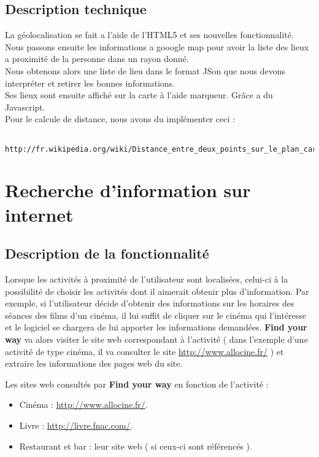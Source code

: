 \documentclass[10pt,a4paper]{report}
\begin{document}
\subsection{Description technique}
\begin{flushleft}
La géolocalisation se fait a l'aide de l'HTML5 et ses nouvelles fonctionnalité. Nous passons ensuite les informations a gooogle map pour avoir la liste des lieux a proximité de la personne dans un rayon donné. \\
Nous obtenons alors une liste de lieu dans le format JSon que nous devons interpréter et retirer les bonnes informations.\\
Ses lieux sont ensuite affiché sur la carte à l'aide marqueur. Grâce a du Javascript. \\

Pour le calcule de distance, nous avons du implémenter ceci : 
\begin{verbatim}
	http://fr.wikipedia.org/wiki/Distance_entre_deux_points_sur_le_plan_cart%C3%A9sien$ 
\end{verbatim}
\end{flushleft}



\section{Recherche d'information sur internet}

\subsection{Description de la fonctionnalité}
\begin{flushleft}
Lorsque les activités à proximité de l'utilisateur sont localisées, celui-ci à la possibilité de choisir les activités dont il aimerait obtenir plus d'information.
Par exemple, si l'utilisateur décide d'obtenir des informations sur les horaires des séances des films d'un cinéma, il lui suffit de cliquer sur le cinéma qui l’intéresse et le logiciel se chargera de lui apporter les informations demandées.
\textbf{Find your way} va alors visiter le site web correspondant à l'activité ( dans l'exemple d'une activité de type cinéma, il va consulter le site \url{http://www.allocine.fr/} ) et extraire les informations des pages web du site.

Les sites web consultés par \textbf{Find your way} en fonction de l'activité :

\begin{itemize}
\item Cinéma : \url{http://www.allocine.fr/}.

\item Livre : \url{http://livre.fnac.com/}.

\item Restaurant et bar : leur site web ( si ceux-ci sont référencés ).
\end{itemize}
\end{flushleft}
\end{document}

